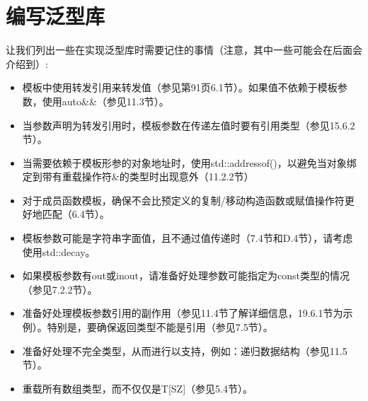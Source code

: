 \section{编写泛型库}
让我们列出一些在实现泛型库时需要记住的事情（注意，其中一些可能会在后面会介绍到）:

\begin{itemize}
\item 
模板中使用转发引用来转发值（参见第91页6.1节）。如果值不依赖于模板参数，使用auto\&\&（参见11.3节）。

\item 
当参数声明为转发引用时，模板参数在传递左值时要有引用类型（参见15.6.2节）。

\item 
当需要依赖于模板形参的对象地址时，使用std::addressof()，以避免当对象绑定到带有重载操作符\&的类型时出现意外（11.2.2节）

\item 
对于成员函数模板，确保不会比预定义的复制/移动构造函数或赋值操作符更好地匹配（6.4节）。

\item 
模板参数可能是字符串字面值，且不通过值传递时（7.4节和D.4节），请考虑使用std::decay。

\item 
如果模板参数有out或inout，请准备好处理参数可能指定为const类型的情况（参见7.2.2节）。

\item 
准备好处理模板参数引用的副作用（参见11.4节了解详细信息，19.6.1节为示例）。特别是，要确保返回类型不能是引用（参见7.5节）。

\item 
准备好处理不完全类型，从而进行以支持，例如：递归数据结构（参见11.5节）。

\item 
重载所有数组类型，而不仅仅是T[SZ]（参见5.4节）。
\end{itemize}